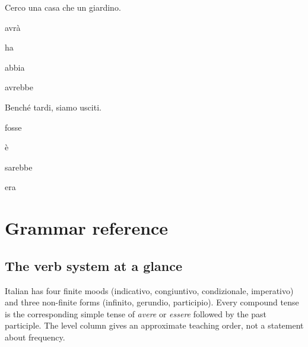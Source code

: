\documentclass[11pt,a4paper,twoside,openright]{book}
\newcommand{\blank}{\underline{\hspace{2.6cm}}}
\begin{document}
\begin{exercises}
\item\label{ex:mix-mood-5}\relax Cerco una casa che \blank{} un giardino.\par\nopagebreak\begin{options}
\item\relax avrà
\item\relax ha
\item\relax abbia
\item\relax avrebbe
\end{options}
\item\label{ex:mix-mood-6}\relax Benché \blank{} tardi, siamo usciti.\par\nopagebreak\begin{options}
\item\relax fosse
\item\relax è
\item\relax sarebbe
\item\relax era
\end{options}
\end{exercises}

\part{Grammar reference}\label{part:reference}

\chapter{The verb system at a glance}\label{ref:system}
Italian has four finite moods (indicativo, congiuntivo, condizionale, imperativo) and three non-finite forms (infinito, gerundio, participio). Every compound tense is the corresponding simple tense of \textit{avere} or \textit{essere} followed by the past participle. The level column gives an approximate teaching order, not a statement about frequency.\par
\end{document}
